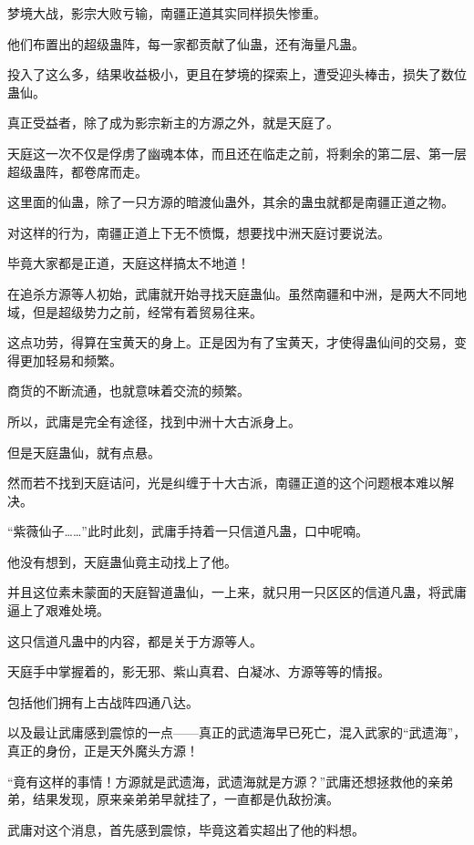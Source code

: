 
\begin{this_body}

梦境大战，影宗大败亏输，南疆正道其实同样损失惨重。

他们布置出的超级蛊阵，每一家都贡献了仙蛊，还有海量凡蛊。

投入了这么多，结果收益极小，更且在梦境的探索上，遭受迎头棒击，损失了数位蛊仙。

真正受益者，除了成为影宗新主的方源之外，就是天庭了。

天庭这一次不仅是俘虏了幽魂本体，而且还在临走之前，将剩余的第二层、第一层超级蛊阵，都卷席而走。

这里面的仙蛊，除了一只方源的暗渡仙蛊外，其余的蛊虫就都是南疆正道之物。

对这样的行为，南疆正道上下无不愤慨，想要找中洲天庭讨要说法。

毕竟大家都是正道，天庭这样搞太不地道！

在追杀方源等人初始，武庸就开始寻找天庭蛊仙。虽然南疆和中洲，是两大不同地域，但是超级势力之前，经常有着贸易往来。

这点功劳，得算在宝黄天的身上。正是因为有了宝黄天，才使得蛊仙间的交易，变得更加轻易和频繁。

商货的不断流通，也就意味着交流的频繁。

所以，武庸是完全有途径，找到中洲十大古派身上。

但是天庭蛊仙，就有点悬。

然而若不找到天庭诘问，光是纠缠于十大古派，南疆正道的这个问题根本难以解决。

“紫薇仙子……”此时此刻，武庸手持着一只信道凡蛊，口中呢喃。

他没有想到，天庭蛊仙竟主动找上了他。

并且这位素未蒙面的天庭智道蛊仙，一上来，就只用一只区区的信道凡蛊，将武庸逼上了艰难处境。

这只信道凡蛊中的内容，都是关于方源等人。

天庭手中掌握着的，影无邪、紫山真君、白凝冰、方源等等的情报。

包括他们拥有上古战阵四通八达。

以及最让武庸感到震惊的一点——真正的武遗海早已死亡，混入武家的“武遗海”，真正的身份，正是天外魔头方源！

“竟有这样的事情！方源就是武遗海，武遗海就是方源？”武庸还想拯救他的亲弟弟，结果发现，原来亲弟弟早就挂了，一直都是仇敌扮演。

武庸对这个消息，首先感到震惊，毕竟这着实超出了他的料想。


\end{this_body}
